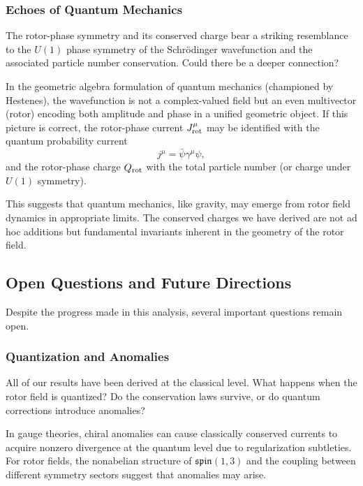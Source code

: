 \documentclass[11pt,a4paper]{article}
\numberwithin{equation}{section}
\theoremstyle{plain}
\theoremstyle{definition}
\theoremstyle{remark}
\begin{document}
\subsubsection{Echoes of Quantum Mechanics}

The rotor-phase symmetry and its conserved charge bear a striking resemblance to the $U(1)$ phase symmetry of the Schrödinger wavefunction and the associated particle number conservation. Could there be a deeper connection?

In the geometric algebra formulation of quantum mechanics (championed by Hestenes), the wavefunction is not a complex-valued field but an even multivector (rotor) encoding both amplitude and phase in a unified geometric object. If this picture is correct, the rotor-phase current $J^\mu_{\rm rot}$ may be identified with the quantum probability current
\begin{equation}
j^\mu = \bar{\psi}\gamma^\mu\psi,
\end{equation}
and the rotor-phase charge $Q_{\rm rot}$ with the total particle number (or charge under $U(1)$ symmetry).

This suggests that quantum mechanics, like gravity, may emerge from rotor field dynamics in appropriate limits. The conserved charges we have derived are not ad hoc additions but fundamental invariants inherent in the geometry of the rotor field.

\subsection{Open Questions and Future Directions}

Despite the progress made in this analysis, several important questions remain open.

\subsubsection{Quantization and Anomalies}

All of our results have been derived at the classical level. What happens when the rotor field is quantized? Do the conservation laws survive, or do quantum corrections introduce anomalies?

In gauge theories, chiral anomalies can cause classically conserved currents to acquire nonzero divergence at the quantum level due to regularization subtleties. For rotor fields, the nonabelian structure of $\mathfrak{spin}(1,3)$ and the coupling between different symmetry sectors suggest that anomalies may arise.
\end{document}
